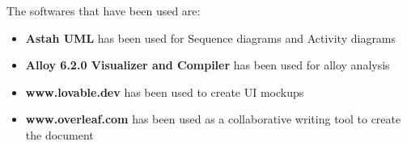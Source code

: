 The softwares that have been used are: \\
\begin{itemize}
    \item \textbf{Astah UML} has been used for Sequence diagrams and Activity diagrams
    \item \textbf{Alloy 6.2.0 Visualizer and Compiler} has been used for alloy analysis
    \item \textbf{www.lovable.dev} has been used to create UI mockups 
    \item \textbf{www.overleaf.com} has been used as a collaborative writing tool to create the document
\end{itemize}